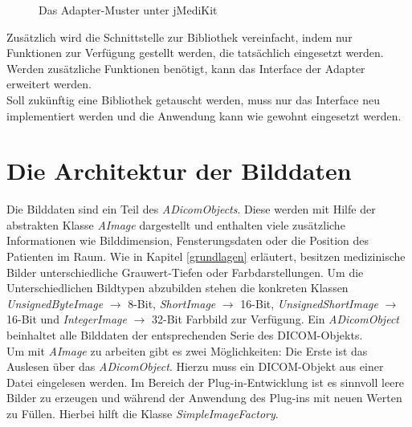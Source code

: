 \begin{figure}[htbp]
  \vspace{0.5cm}
  \centering
  \caption{Das Adapter-Muster unter jMediKit}
  \label{dicomo}
  \vspace{0.5cm}
\end{figure}

Zusätzlich wird die Schnittstelle zur Bibliothek vereinfacht, indem nur Funktionen zur Verfügung gestellt werden, die tatsächlich eingesetzt werden. Werden zusätzliche Funktionen benötigt, kann das Interface der Adapter erweitert werden.\\
Soll zukünftig eine Bibliothek getauscht werden, muss nur das Interface neu implementiert werden und die Anwendung kann wie gewohnt eingesetzt werden.

\section{Die Architektur der Bilddaten}

Die Bilddaten sind ein Teil des \textit{ADicomObjects}. Diese werden mit Hilfe der abstrakten Klasse \textit{AImage} dargestellt und enthalten viele zusätzliche Informationen wie Bilddimension, Fensterungsdaten oder die Position des Patienten im Raum. Wie in Kapitel \ref{grundlagen} erläutert, besitzen medizinische Bilder unterschiedliche Grauwert-Tiefen oder Farbdarstellungen. Um die Unterschiedlichen Bildtypen abzubilden stehen die konkreten Klassen \textit{UnsignedByteImage} $\rightarrow$ 8-Bit, \textit{ShortImage} $\rightarrow$ 16-Bit, \textit{UnsignedShortImage} $\rightarrow$ 16-Bit und \textit{IntegerImage} $\rightarrow$ 32-Bit Farbbild zur Verfügung. Ein \textit{ADicomObject} beinhaltet alle Bilddaten der entsprechenden Serie des DICOM-Objekts.\\
Um mit \textit{AImage} zu arbeiten gibt es zwei Möglichkeiten: Die Erste ist das Auslesen über das \textit{ADicomObject}. Hierzu muss ein DICOM-Objekt aus einer Datei eingelesen werden. Im Bereich der Plug-in-Entwicklung ist es sinnvoll leere Bilder zu erzeugen und während der Anwendung des Plug-ins mit neuen Werten zu Füllen. Hierbei hilft die Klasse \textit{SimpleImageFactory}.

